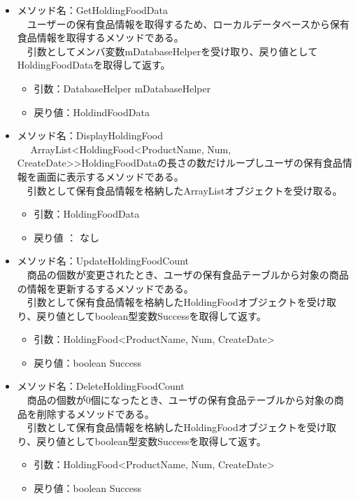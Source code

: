 \documentclass[a4j]{jarticle}
\begin{document}
\begin{itemize}
\item メソッド名：GetHoldingFoodData\\
  　ユーザーの保有食品情報を取得するため、ローカルデータベースから保有食品情報を取得するメソッドである。\\
  　引数としてメンバ変数mDatabaseHelperを受け取り、戻り値としてHoldingFoodDataを取得して返す。
  \begin{itemize}
  \item 引数：DatabaseHelper mDatabaseHelper
  \item 戻り値：HoldindFoodData
  \end{itemize}

\item メソッド名：DisplayHoldingFood\\
 　 ArrayList\textless  HoldingFood\textless ProductName, Num, CreateDate\textgreater \textgreater  HoldingFoodDataの長さの数だけループしユーザの保有食品情報を画面に表示するメソッドである。\\
  　引数として保有食品情報を格納したArrayListオブジェクトを受け取る。
  \begin{itemize}
  \item 引数：HoldingFoodData
  \item 戻り値 ： なし
  \end{itemize}

\item メソッド名：UpdateHoldingFoodCount\\
  　商品の個数が変更されたとき、ユーザの保有食品テーブルから対象の商品の情報を更新するするメソッドである。\\
  　引数として保有食品情報を格納したHoldingFoodオブジェクトを受け取り、戻り値としてboolean型変数Successを取得して返す。
  \begin{itemize}
  \item 引数：HoldingFood\textless ProductName, Num, CreateDate\textgreater
  \item 戻り値：boolean Success
  \end{itemize}

\item メソッド名：DeleteHoldingFoodCount\\
  　商品の個数が0個になったとき、ユーザの保有食品テーブルから対象の商品を削除するメソッドである。\\
  　引数として保有食品情報を格納したHoldingFoodオブジェクトを受け取り、戻り値としてboolean型変数Successを取得して返す。
  \begin{itemize}
  \item 引数：HoldingFood\textless ProductName, Num, CreateDate\textgreater
  \item 戻り値：boolean Success
  \end{itemize}


\end{itemize}
\end{document}
